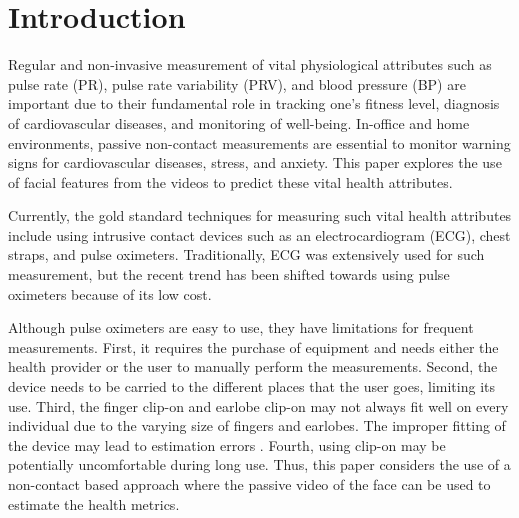 \section{Introduction}\label{sec:intro}

%

Regular and non-invasive measurement of vital physiological attributes such as pulse rate (PR),  pulse rate variability (PRV), and blood pressure (BP) are important due to their fundamental role in tracking one's fitness level, diagnosis of cardiovascular diseases, and monitoring of well-being. In-office and home environments, passive non-contact measurements are essential to monitor warning signs for cardiovascular diseases, stress, and anxiety. This paper explores the use of facial features from the videos to predict these vital health attributes.


%
%
	
%

%
%

%
%




%
Currently, the gold standard techniques for measuring such vital health attributes include using intrusive contact devices such as an electrocardiogram (ECG), chest straps, and pulse oximeters. Traditionally, ECG was extensively used for such measurement, but the recent trend has been shifted towards using pulse oximeters because of its low cost. 

Although pulse oximeters are easy to use, they have limitations for frequent measurements. First, it requires the purchase of equipment and needs either the health provider or the user to manually perform the measurements. Second, the device needs to be carried to the different places that the user goes, limiting its use. Third, the finger clip-on and earlobe clip-on may not always fit well on every individual due to the varying size of fingers and earlobes. The improper fitting of the device may lead to estimation errors \cite{haynes2007ear}. Fourth, using clip-on may be potentially uncomfortable during long use. Thus, this paper considers the use of a non-contact based approach where the passive video of the face can be used to estimate the health metrics. 
%



